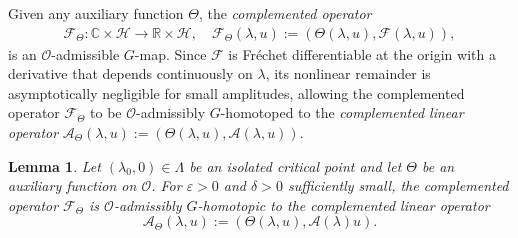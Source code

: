 \documentclass[twoside,11pt]{article}
\def\bc{{\mathbb{C}}}
\def\br{{\mathbb{R}}}
\newtheorem{lemma}[theorem]{Lemma}
\begin{document}
Given any auxiliary function $\Theta$, the {\it complemented operator}
\begin{align*} 
\mathscr F_\Theta : \bc \times \mathscr H \rightarrow \br \times \mathscr H, \quad   \mathscr F_\Theta(\lambda,u):= (\Theta(\lambda,u),\mathscr F(\lambda,u)),
\end{align*}
is an $\mathscr O$-admissible $G$-map. Since $\mathscr{F}$ is Fréchet differentiable at the origin with a derivative that depends continuously on $\lambda$, its nonlinear remainder is asymptotically negligible for small amplitudes, allowing the complemented operator $\mathscr F_\Theta$ to be $\mathscr O$-admissibly $G$-homotoped to the \emph{complemented linear operator} $\mathscr A_\Theta(\lambda,u):= (\Theta(\lambda,u),\mathscr A(\lambda,u))$.
\begin{lemma}\label{lem:linearization_homotopy}
Let $(\lambda_0,0) \in \Lambda$ be an isolated critical point and let $\Theta$ be an auxiliary function on $\mathscr{O}$. For $\varepsilon > 0$ and $\delta > 0$ sufficiently small, the complemented operator $\mathscr{F}_\Theta$ is $\mathscr{O}$-admissibly $G$-homotopic to the complemented linear operator 
\[
\mathscr{A}_\Theta(\lambda,u) := (\Theta(\lambda,u), \mathscr{A}(\lambda)u).
\]
\end{lemma}
\end{document}
